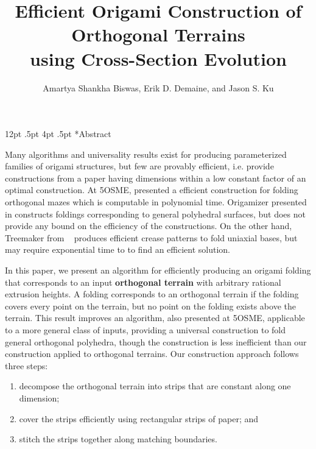 \documentclass[a4paper,11pt]{article}
\title{Efficient Origami Construction of Orthogonal Terrains \\
using Cross-Section Evolution}
\author{Amartya Shankha Biswas, Erik D. Demaine, 
and Jason S. Ku}
\makeatletter
\renewcommand\section{\@startsection {section}{1}{\z@}%
                                   {12pt \@plus .5pt}%
                                   {4pt \@plus.5pt}%
                                   {\centering\normalfont\bfseries}}
\makeatother
\begin{document}
\maketitle


\section*{Abstract}

Many algorithms and universality results exist for producing parameterized
families of origami structures, but few are provably efficient, i.e. provide
constructions from a paper having dimensions within a low constant factor of an
optimal construction. At 5OSME, \cite{MazeFolding_Origami5} presented a
efficient construction for folding orthogonal mazes which is computable in
polynomial time. Origamizer presented in \cite{Origamizer_SoCG2017} constructs
foldings corresponding to general polyhedral surfaces, but does not provide any
bound on the efficiency of the constructions. On the other hand, Treemaker from
~\cite{Lang} produces efficient crease patterns to fold uniaxial bases, but may
require exponential time to to find an efficient solution. 

In this paper, we present an algorithm for efficiently producing an origami
folding that corresponds to an input {\bf orthogonal terrain} with arbitrary
rational extrusion heights. A folding corresponds to an orthogonal terrain if
the folding covers every point on the terrain, but no point on the folding
exists above the terrain. This result improves an algorithm,
\cite{BoxPleating_Origami5} also presented at 5OSME, applicable to a more
general class of inputs, providing a universal construction to fold general
orthogonal polyhedra, though the construction is less inefficient than our
construction applied to orthogonal terrains. Our construction approach follows
three steps: 

\vspace{-0.2pc} 
\begin{enumerate} 
\item decompose the orthogonal terrain into strips that are constant along one
dimension; 
\item cover the strips efficiently using rectangular strips of paper; and 
\item stitch the strips together along matching boundaries. 
\end{enumerate}
\vspace{-0.2pc}
\end{document}
